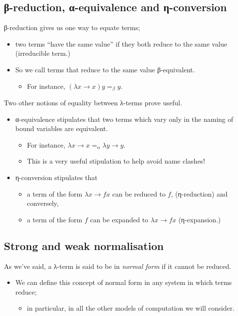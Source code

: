 \documentclass[11pt]{article}
\theoremstyle{definition}
\begin{document}
\subsection{β-reduction, α-equivalence and η-conversion}
\label{sec:org7891da5}
β-reduction gives us one way to equate terms;
\begin{itemize}
\item two terms “have the same value” if they both reduce to the same
value (irreducible term.)
\item So we call terms that reduce to the same value
β-equivalent.
\begin{itemize}
\item For instance, \((λ x → x) y =_{β} y\).
\end{itemize}
\end{itemize}

Two other notions of equality between λ-terms prove useful.
\begin{itemize}
\item α-equivalence stipulates that two terms which vary
only in the naming of bound variables are equivalent.
\begin{itemize}
\item For instance, \(λ x → x =_{α} λ y → y\).
\item This is a very useful stipulation to help avoid
name clashes!
\end{itemize}
\item η-conversion stipulates that
\begin{itemize}
\item a term of the form \(λ x → f x\) can be reduced to \(f\),
(η-reduction)
and conversely,
\item a term of the form \(f\) can be expanded to \(λ x → f x\)
(η-expansion.)
\end{itemize}
\end{itemize}

\subsection{Strong and weak normalisation}
\label{sec:orga6f4d51}

As we've said, a λ-term is said to be
in \emph{normal form} if it cannot be reduced.
\begin{itemize}
\item We can define this concept of normal form
in any system in which terms reduce;
\begin{itemize}
\item in particular, in all the other models of computation
we will consider.
\end{itemize}
\end{itemize}
\end{document}
